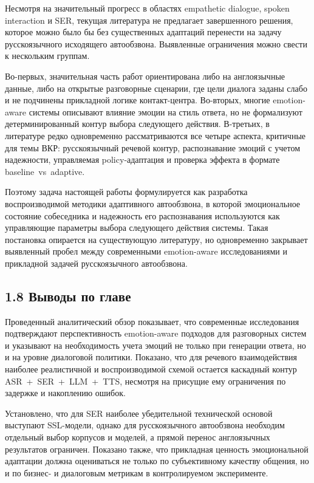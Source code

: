 \documentclass[a4paper,14pt]{extarticle}
\renewcommand{\texttt}[1]{\textnormal{#1}}
\begin{document}
Несмотря на значительный прогресс в областях empathetic dialogue, spoken
interaction и SER, текущая литература не предлагает завершенного
решения, которое можно было бы без существенных адаптаций перенести на
задачу русскоязычного исходящего автообзвона. Выявленные ограничения
можно свести к нескольким группам.

Во-первых, значительная часть работ ориентирована либо на англоязычные
данные, либо на открытые разговорные сценарии, где цели диалога заданы
слабо и не подчинены прикладной логике контакт-центра. Во-вторых, многие
emotion-aware системы описывают влияние эмоции на стиль ответа, но не
формализуют детерминированный контур выбора следующего действия.
В-третьих, в литературе редко одновременно рассматриваются все четыре
аспекта, критичные для темы ВКР: русскоязычный речевой контур,
распознавание эмоций с учетом надежности, управляемая
\texttt{policy}-адаптация и проверка эффекта в формате
\texttt{baseline\ vs\ adaptive}.

Поэтому задача настоящей работы формулируется как разработка
воспроизводимой методики адаптивного автообзвона, в которой
эмоциональное состояние собеседника и надежность его распознавания
используются как управляющие параметры выбора следующего действия
системы. Такая постановка опирается на существующую литературу, но
одновременно закрывает выявленный пробел между современными
emotion-aware исследованиями и прикладной задачей русскоязычного
автообзвона.

\subsection{1.8 Выводы по
главе}\label{ux432ux44bux432ux43eux434ux44b-ux43fux43e-ux433ux43bux430ux432ux435}

Проведенный аналитический обзор показывает, что современные исследования
подтверждают перспективность emotion-aware подходов для разговорных
систем и указывают на необходимость учета эмоций не только при генерации
ответа, но и на уровне диалоговой политики. Показано, что для речевого
взаимодействия наиболее реалистичной и воспроизводимой схемой остается
каскадный контур \texttt{ASR\ +\ SER\ +\ LLM\ +\ TTS}, несмотря на
присущие ему ограничения по задержке и накоплению ошибок.

Установлено, что для \texttt{SER} наиболее убедительной технической
основой выступают SSL-модели, однако для русскоязычного автообзвона
необходим отдельный выбор корпусов и моделей, а прямой перенос
англоязычных результатов ограничен. Показано также, что прикладная
ценность эмоциональной адаптации должна оцениваться не только по
субъективному качеству общения, но и по бизнес- и диалоговым метрикам в
контролируемом эксперименте.
\end{document}
